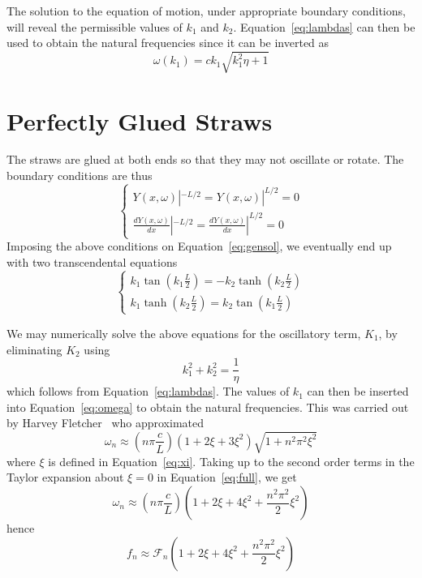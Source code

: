 \documentclass[twoside]{article}
\begin{document}
\begin{multicols}{2}
The solution to the equation of motion, under appropriate boundary conditions, will reveal the permissible values of $k_1$ and $k_2$. Equation~\ref{eq:lambdas} can then be used to obtain the natural frequencies since it can be inverted as
\begin{equation}
\omega(k_1) =  c k_1 \sqrt{ k^2_1 \eta + 1}
\label{eq:omega}
\end{equation}






\section{Perfectly Glued Straws}
The straws are glued at both ends so that they may not oscillate or rotate.  The boundary conditions are thus
\begin{equation}
\label{eq:clamped}
\begin{cases}
Y(x,\omega)|^{-L/2} = Y(x,\omega)|^{L/2} = 0 \\
\frac{dY(x,\omega)}{dx}|^{-L/2} = \frac{dY(x,\omega)}{dx}|^{L/2} = 0 
\end{cases} 
\end{equation}
Imposing the above conditions on Equation~\ref{eq:gensol}, we eventually end up with two transcendental equations
\begin{equation}
\begin{cases}
k_1 \tan(k_1 \frac{L}{2}) = - k_2 \tanh(k_2 \frac{L}{2}) \\
k_1 \tanh(k_2 \frac{L}{2}) =  k_2 \tan(k_1 \frac{L}{2})  
\end{cases} 
\label{eq:trans}
\end{equation}

We may numerically solve the above equations for the oscillatory term, $K_1$, by eliminating $K_2$ using
\begin{equation}
k^2_1 + k^2_2 = \frac{1}{\eta}
\label{eq:rel}
\end{equation}
which follows from Equation~\ref{eq:lambdas}. The values of $k_1$ can then be inserted into Equation~\ref{eq:omega} to obtain the natural frequencies.  This was carried out by Harvey Fletcher~\cite{fletcher} who approximated 
 \begin{equation}
 	\omega_n \approx (n \pi \frac{c}{L})(1 + 2\xi + 3 \xi^2)\sqrt{1 + n^2\pi^2\xi^2}
 \label{eq:full}
 \end{equation}
 where $\xi$ is defined in Equation~\ref{eq:xi}.
 Taking up to the second order terms in the Taylor expansion about $\xi = 0$ in Equation~\ref{eq:full}, we get
  \begin{equation}
  \omega_n \approx (n \pi \frac{c}{L}) (1 + 2\xi + 4\xi^2 + \frac{n^2\pi^2}{2}\xi^2)
  \end{equation}
 hence
  \begin{equation}
  	f_n \approx \mathcal{F}_n (1 + 2\xi + 4\xi^2 + \frac{n^2\pi^2}{2}\xi^2)
 \label{eq:hence}
 \end{equation}
  

\end{multicols}
\end{document}

